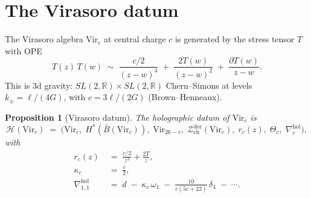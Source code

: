 \documentclass[11pt,reqno]{amsart}
\newtheorem{proposition}[theorem]{Proposition}
\theoremstyle{definition}
\theoremstyle{remark}
\newcommand{\cH}{\mathcal{H}}
\newcommand{\cZ}{\mathcal{Z}}
\newcommand{\Vir}{\mathrm{Vir}}
\newcommand{\barB}{\bar{B}}
\newcommand{\hol}{\mathrm{hol}}
\newcommand{\bR}{\mathbb{R}}
\numberwithin{equation}{section}
\begin{document}
\section{The Virasoro datum}\label{sec:virasoro}

The Virasoro algebra $\Vir_c$ at central charge $c$ is generated by
the stress tensor $T$ with OPE
\begin{equation}\label{eq:vir-ope}
T(z)\,T(w)
\;\sim\;
\frac{c/2}{(z-w)^4}
\;+\;
\frac{2T(w)}{(z-w)^2}
\;+\;
\frac{\partial T(w)}{z-w}.
\end{equation}
This is 3d gravity: $SL(2,\bR) \times SL(2,\bR)$ Chern--Simons
at levels $k_\pm = \ell/(4G)$, with $c = 3\ell/(2G)$
(Brown--Henneaux).

\begin{proposition}[Virasoro datum]\label{prop:vir-datum}
The holographic datum of $\Vir_c$ is
\begin{equation}\label{eq:vir-datum}
\cH(\Vir_c)
\;=\;
\bigl(\Vir_c,\; H^*(\barB(\Vir_c)),\; \Vir_{26-c},\;
\cZ^{\mathrm{der}}_{\mathrm{ch}}(\Vir_c),\; r_c(z),\;
\Theta_c,\; \nabla^{\hol}_c\bigr),
\end{equation}
with
\begin{align}
r_c(z) &\;=\; \frac{c/2}{z^3} + \frac{2T}{z},
\label{eq:vir-r}\\[3pt]
\kappa_c &\;=\; \frac{c}{2},
\label{eq:vir-kappa}\\[3pt]
\nabla^{\hol}_{1,1}
&\;=\; d \;-\; \kappa_c\,\omega_1
\;-\; \frac{10}{c(5c+22)}\,\delta_4 \;-\; \cdots.
\label{eq:vir-connection}
\end{align}
\end{proposition}
\end{document}
